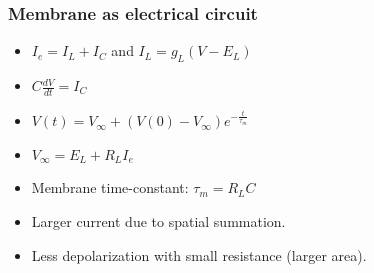 \documentclass[a4paper, 12pt]{article}
\begin{document}
\subsubsection{Membrane as electrical circuit}
\begin{itemize}[noitemsep,nolistsep]
	\item $I_e = I_L + I_C$ and $I_L=g_L(V-E_L)$
	\item $C\frac{dV}{dt} = I_C$
	\item $V(t) = V_\infty+(V(0)-V_\infty)e^{-\frac{t}{\tau_m}}$
	\item $V_\infty = E_L + R_LI_e$
	\item Membrane time-constant: $\tau_m = R_LC$
	\item Larger current due to spatial summation.
	\item Less depolarization with small resistance (larger area).
\end{itemize}
\end{document}
